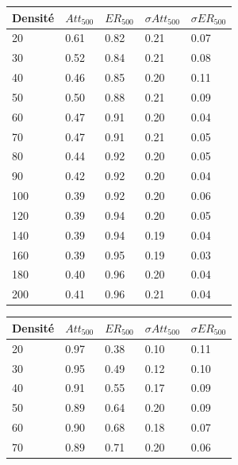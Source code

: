 \documentclass[10pt]{report}
\begin{document}
\begin{figure}[H]
\begin{minipage}[b]{0.5\textwidth} \begin{flushleft}
\centering
\begin{tabular}{|l|l|l|l|l|} \hline
  	Densité & $Att_{500}$ & $ER_{500}$ & $\sigma Att_{500}$ & $\sigma ER_{500}$\\ \hline
	20 & 0.61 & 0.82 & 0.21 & 0.07 \\ \hline
  	30 & 0.52 & 0.84 & 0.21 & 0.08 \\ \hline
  	40 & 0.46 & 0.85 & 0.20 & 0.11 \\ \hline
  	50 & 0.50 & 0.88 & 0.21 & 0.09 \\ \hline
  	60 & 0.47 & 0.91 & 0.20 & 0.04 \\ \hline
  	70 & 0.47 & 0.91 & 0.21 & 0.05 \\ \hline
    80 & 0.44 & 0.92 & 0.20 & 0.05 \\ \hline
  	90 & 0.42 & 0.92 & 0.20 & 0.04 \\ \hline
  	100 & 0.39 & 0.92 & 0.20 & 0.06 \\ \hline
  	120 & 0.39 & 0.94 & 0.20 & 0.05 \\ \hline
  	140 & 0.39 & 0.94 & 0.19 & 0.04 \\ \hline
  	160 & 0.39 & 0.95 & 0.19 & 0.03 \\ \hline
  	180 & 0.40 & 0.96 & 0.20 & 0.04 \\ \hline
  	200 & 0.41 & 0.96 & 0.21 & 0.04 \\ \hline
\end{tabular}
\end{flushleft}\end{minipage}
\begin{minipage}[b]{0.5\textwidth} \begin{flushright}
\centering
\begin{tabular}{|l|l|l|l|l|} \hline
  	Densité & $Att_{500}$ & $ER_{500}$ & $\sigma Att_{500}$ & $\sigma ER_{500}$\\ \hline
	20 & 0.97 & 0.38 & 0.10 & 0.11 \\ \hline
  	30 & 0.95 & 0.49 & 0.12 & 0.10 \\ \hline
  	40 & 0.91 & 0.55 & 0.17 & 0.09 \\ \hline
  	50 & 0.89 & 0.64 & 0.20 & 0.09 \\ \hline
  	60 & 0.90 & 0.68 & 0.18 & 0.07 \\ \hline
  	70 & 0.89 & 0.71 & 0.20 & 0.06 \\ \hline

\end{tabular}
\end{flushright}
\end{minipage}
\end{figure}
\end{document}
